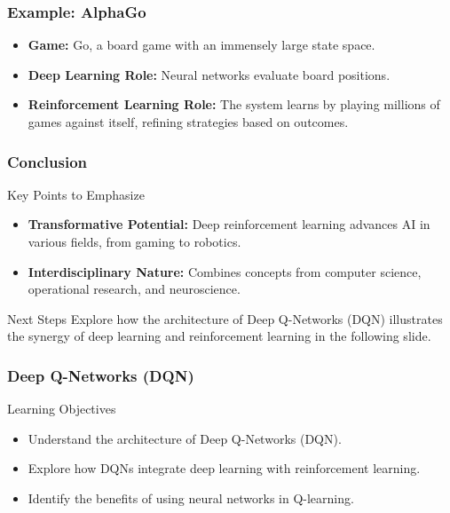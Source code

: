 \documentclass[aspectratio=169]{beamer}
\begin{document}
\begin{frame}[fragile]
    \frametitle{Example: AlphaGo}
    \begin{itemize}
        \item \textbf{Game:} Go, a board game with an immensely large state space.
        \item \textbf{Deep Learning Role:} Neural networks evaluate board positions.
        \item \textbf{Reinforcement Learning Role:} The system learns by playing millions of games against itself, refining strategies based on outcomes.
    \end{itemize}
\end{frame}

\begin{frame}[fragile]
    \frametitle{Conclusion}
    \begin{block}{Key Points to Emphasize}
        \begin{itemize}
            \item \textbf{Transformative Potential:} Deep reinforcement learning advances AI in various fields, from gaming to robotics.
            \item \textbf{Interdisciplinary Nature:} Combines concepts from computer science, operational research, and neuroscience.
        \end{itemize}
    \end{block}
    \begin{block}{Next Steps}
        Explore how the architecture of Deep Q-Networks (DQN) illustrates the synergy of deep learning and reinforcement learning in the following slide.
    \end{block}
\end{frame}

\begin{frame}[fragile]
  \frametitle{Deep Q-Networks (DQN)}
  
  \begin{block}{Learning Objectives}
    \begin{itemize}
      \item Understand the architecture of Deep Q-Networks (DQN).
      \item Explore how DQNs integrate deep learning with reinforcement learning.
      \item Identify the benefits of using neural networks in Q-learning.
    \end{itemize}
  \end{block}
\end{frame}
\end{document}
